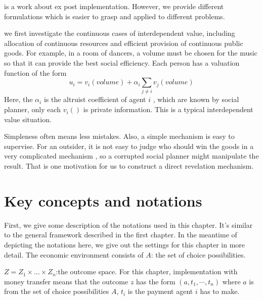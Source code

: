  \parencite{Ely2006} is a work about ex post implementation. However, we provide different formulations which is easier to grasp and applied to different problems.
 
 we first investigate the continuous
 cases of interdependent value,  including allocation of continuous resources and efficient provision of continuous public goods. 
 For example, in a room of dancers, a volume must be chosen for the music so that it can provide the best social efficiency. Each person
 has a valuation function of the form 
 $$u_i= v_i(volume) + \alpha_i\sum_{j\neq i}v_j(volume)$$
 Here, the $\alpha_i$ is the altruist coefficient of agent $i$ , which are known by social planner, only each $v_i()$ is private information. This is a typical interdependent value situation.

 
 


 
Simpleness often means less mistakes. Also, a simple mechanism is  easy to supervise. For an outsider, it is not easy to judge who should win the goods in a very complicated mechanism
, so a corrupted social planner might manipulate the result. That is one motivation for us to construct a direct revelation mechanism.





\section{Key concepts and notations}
First, we give some description of the notations used in this chapter. It's similar to the general framework described in the first chapter. In the meantime of depicting the notations here, we give out the settings for this 
chapter in more detail.
The economic environment consists of
$A$: the set of choice possibilities.

$Z=Z_1\times \dots\times Z_n$:the outcome space. For this chapter, implementation with money transfer means that the 
outcome $z$ has the form $(a, t_1,\cdots,t_n)$ where $a$ is from the set of choice possibilities $A$, $t_i$ is 
the payment agent $i$ has to make.

